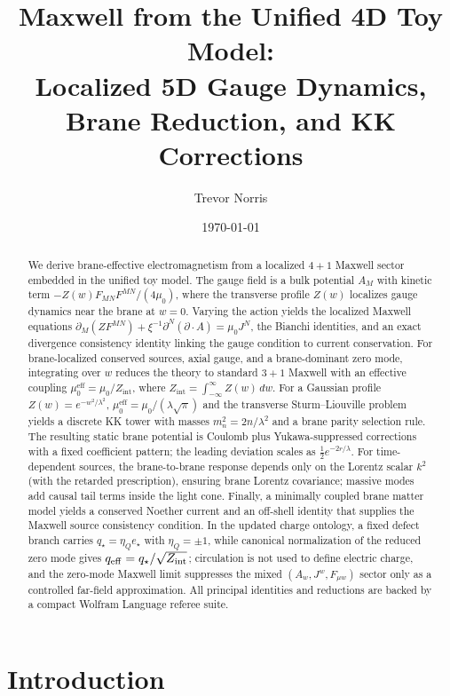 \documentclass[11pt]{article}
\title{Maxwell from the Unified 4D Toy Model:\\
Localized 5D Gauge Dynamics, Brane Reduction, and KK Corrections}
\author{Trevor Norris}
\date{\today}
\newcommand{\etaQ}{\eta_Q}
\newcommand{\estar}{e_\star}
\newcommand{\qstar}{q_\star}
\newcommand{\qeff}{q_{\rm eff}}
\begin{document}
\maketitle

\begin{abstract}
We derive brane-effective electromagnetism from a localized \(4+1\) Maxwell sector
embedded in the unified toy model. The gauge field is a bulk potential \(A_M\)
with kinetic term \(-Z(w)F_{MN}F^{MN}/(4\mu_0)\), where the transverse profile
\(Z(w)\) localizes gauge dynamics near the brane at \(w=0\). Varying the action
yields the localized Maxwell equations
\(\partial_M(ZF^{MN})+\xi^{-1}\partial^N(\partial\!\cdot\!A)=\mu_0J^N\), the
Bianchi identities, and an exact divergence consistency identity linking the
gauge condition to current conservation. For brane-localized conserved sources,
axial gauge, and a brane-dominant zero mode, integrating over \(w\) reduces the
theory to standard \(3+1\) Maxwell with an effective coupling
\(\mu_0^{\mathrm{eff}}=\mu_0/Z_{\mathrm{int}}\), where
\(Z_{\mathrm{int}}=\int_{-\infty}^{\infty}Z(w)\,dw\). For a Gaussian profile
\(Z(w)=e^{-w^2/\lambda^2}\), \(\mu_0^{\mathrm{eff}}=\mu_0/(\lambda\sqrt{\pi})\) and
the transverse Sturm--Liouville problem yields a discrete KK tower with masses
\(m_n^2=2n/\lambda^2\) and a brane parity selection rule. The resulting static
brane potential is Coulomb plus Yukawa-suppressed corrections with a fixed
coefficient pattern; the leading deviation scales as
\(\tfrac12 e^{-2r/\lambda}\). For time-dependent sources, the brane-to-brane
response depends only on the Lorentz scalar \(k^2\) (with the retarded
prescription), ensuring brane Lorentz covariance; massive modes add causal tail
terms inside the light cone. Finally, a minimally coupled brane matter model
yields a conserved Noether current and an off-shell identity that supplies the
Maxwell source consistency condition. In the updated charge ontology, a fixed
defect branch carries \(\qstar=\etaQ\estar\) with \(\etaQ=\pm1\), while canonical
normalization of the reduced zero mode gives
\(\qeff=\qstar/\sqrt{Z_{\mathrm{int}}}\); circulation is not used to define
electric charge, and the zero-mode Maxwell limit suppresses the mixed
\((A_w,J^w,F_{\mu w})\) sector only as a controlled far-field approximation. All
principal identities and reductions are backed by a compact Wolfram Language
referee suite.
\end{abstract}

\section{Introduction}
\label{sec:intro}
\end{document}
